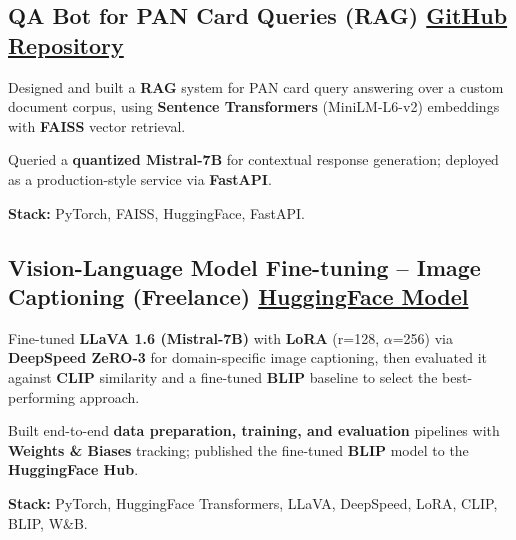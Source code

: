 \documentclass[letter,10pt]{article}
\begin{document}
\subsection{QA Bot for PAN Card Queries (RAG) \hfill \href{https://github.com/sunil448832/Natural-Language-Processing/tree/master/RAG(Retrieval\%20Augment\%20Generation)}{GitHub Repository}}
\begin{zitemize}
\item Designed and built a \textbf{RAG} system for PAN card query answering over a custom document corpus, using \textbf{Sentence Transformers} (MiniLM-L6-v2) embeddings with \textbf{FAISS} vector retrieval.
\item Queried a \textbf{quantized Mistral-7B} for contextual response generation; deployed as a production-style service via \textbf{FastAPI}.
\item \textbf{Stack:} PyTorch, FAISS, HuggingFace, FastAPI.
\end{zitemize}

\subsection{Vision-Language Model Fine-tuning – Image Captioning (Freelance) \hfill \href{https://huggingface.co/sunil448832/blip-model}{HuggingFace Model}}
\begin{zitemize}
\item Fine-tuned \textbf{LLaVA 1.6 (Mistral-7B)} with \textbf{LoRA} (r=128, $\alpha$=256) via \textbf{DeepSpeed ZeRO-3} for domain-specific image captioning, then evaluated it against \textbf{CLIP} similarity and a fine-tuned \textbf{BLIP} baseline to select the best-performing approach.
\item Built end-to-end \textbf{data preparation, training, and evaluation} pipelines with \textbf{Weights \& Biases} tracking; published the fine-tuned \textbf{BLIP} model to the \textbf{HuggingFace Hub}.
\item \textbf{Stack:} PyTorch, HuggingFace Transformers, LLaVA, DeepSpeed, LoRA, CLIP, BLIP, W\&B.
\end{zitemize}
\end{document}
